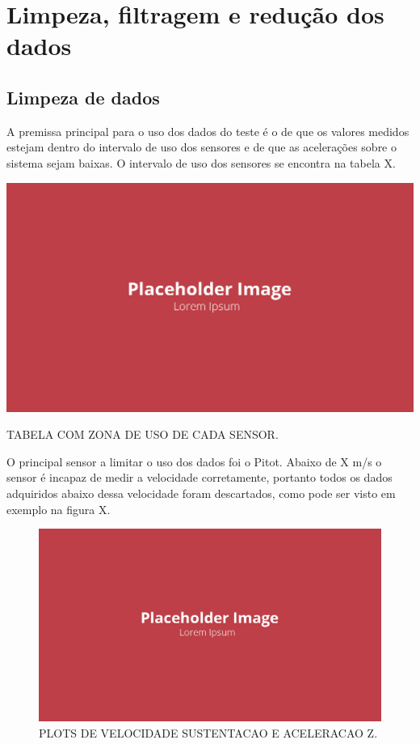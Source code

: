 \section{Limpeza, filtragem e redução dos dados}

\subsection{Limpeza de dados}

A premissa principal para o uso dos dados do teste é o de que os valores medidos estejam dentro do intervalo de uso dos sensores e de que as acelerações sobre o sistema sejam baixas. O intervalo de uso dos sensores se encontra na tabela X.

\begin{table}[!ht]
    \centering
    \includegraphics[width=.8\linewidth]{figuras/placeholder.png}
    \caption{TABELA COM ZONA DE USO DE CADA SENSOR\cite{autor}.}
    \label{fig:placeholder}
\end{table}

O principal sensor a limitar o uso dos dados foi o Pitot. Abaixo de X m/s o sensor é incapaz de medir a velocidade corretamente, portanto todos os dados adquiridos abaixo dessa velocidade foram descartados, como pode ser visto em exemplo na figura X.

\begin{figure}[!ht]
    \centering
    \includegraphics[width=.8\linewidth]{figuras/placeholder.png}
    \caption{PLOTS DE VELOCIDADE SUSTENTACAO E ACELERACAO Z\cite{autor}.}
    \label{fig:placeholder}
\end{figure}

